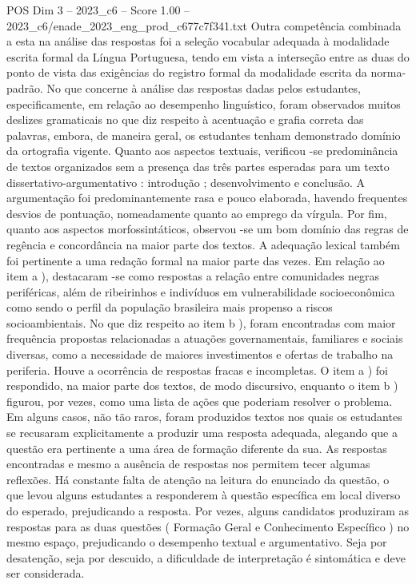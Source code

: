 \begin{textsample}{POS Dim 3 – 2023\_c6 – Score 1.00 – 2023\_c6/enade\_2023\_eng\_prod\_c677c7f341.txt}
Outra competência combinada a esta na análise das respostas foi a seleção vocabular adequada à modalidade escrita formal da Língua Portuguesa, tendo em vista a interseção entre as duas do ponto de vista das exigências do registro formal da modalidade escrita da norma-padrão.
No que concerne à análise das respostas dadas pelos estudantes, especificamente, em relação ao desempenho linguístico, foram observados muitos deslizes gramaticais no que diz respeito à acentuação e grafia correta das palavras, embora, de maneira geral, os estudantes tenham demonstrado domínio da ortografia vigente.
Quanto aos aspectos textuais, verificou -se predominância de textos organizados sem a presença das três partes esperadas para um texto dissertativo-argumentativo : introdução ; desenvolvimento e conclusão.
A argumentação foi predominantemente rasa e pouco elaborada, havendo frequentes desvios de pontuação, nomeadamente quanto ao emprego da vírgula.
Por fim, quanto aos aspectos morfossintáticos, observou -se um bom domínio das regras de regência e concordância na maior parte dos textos.
A adequação lexical também foi pertinente a uma redação formal na maior parte das vezes.
Em relação ao item a ), destacaram -se como respostas a relação entre comunidades negras periféricas, além de ribeirinhos e indivíduos em vulnerabilidade socioeconômica como sendo o perfil da população brasileira mais propenso a riscos socioambientais.
No que diz respeito ao item b ), foram encontradas com maior frequência propostas relacionadas a atuações governamentais, familiares e sociais diversas, como a necessidade de maiores investimentos e ofertas de trabalho na periferia.
Houve a ocorrência de respostas fracas e incompletas.
O item a ) foi respondido, na maior parte dos textos, de modo discursivo, enquanto o item b ) figurou, por vezes, como uma lista de ações que poderiam resolver o problema.
Em alguns casos, não tão raros, foram produzidos textos nos quais os estudantes se recusaram explicitamente a produzir uma resposta adequada, alegando que a questão era pertinente a uma área de formação diferente da sua.
As respostas encontradas e mesmo a ausência de respostas nos permitem tecer algumas reflexões.
Há constante falta de atenção na leitura do enunciado da questão, o que levou alguns estudantes a responderem à questão específica em local diverso do esperado, prejudicando a resposta.
Por vezes, alguns candidatos produziram as respostas para as duas questões ( Formação Geral e Conhecimento Específico ) no mesmo espaço, prejudicando o desempenho textual e argumentativo.
Seja por desatenção, seja por descuido, a dificuldade de interpretação é sintomática e deve ser considerada.

\end{textsample}
